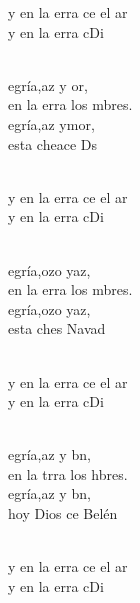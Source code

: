 \begin{cancion}%
	\begin{chorus}%
	y en la erra ce el ar\\
	y en la erra cDi\\
	\end{chorus}%
	\jump\\
	egría,az y or, \\
	en la erra los mbres.\\
	egría,az ymor, \\
	esta cheace Ds\\\jump\\
	\begin{chorus}%
	y en la erra ce el ar\\
	y en la erra cDi\\
	\end{chorus}%
	\jump\\
	egría,ozo yaz,\\
	en la erra los mbres.\\
	egría,ozo yaz,\\
	esta ches Navad\\\jump\\
	\begin{chorus}%
	y en la erra ce el ar\\
	y en la erra cDi\\
	\end{chorus}%
	\jump\\
	egría,az y bn, \\
	en la trra los hbres.\\
	egría,az y bn,\\
	hoy Dios ce  Belén\\\jump\\
	\begin{chorus}%
	y en la erra ce el ar\\
	y en la erra cDi\\
	\end{chorus}%
	\jump\\
\end{cancion}%
